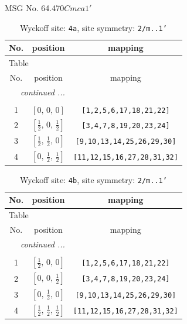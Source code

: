 \documentclass[fleqn,8pt]{jsarticle}
\begin{document}
\setcounter{MaxMatrixCols}{32}

\renewcommand{\tablename}{Table~}
\renewcommand{\figurename}{Figure~}
\begin{center}
\LARGE
MSG No. 64.470\quad$Cmca1'$
\end{center}
\renewcommand{\arraystretch}{1.2}
\begin{longtable}{ccc}
\caption{Wyckoff site: {\tt 4a}, site symmetry: {\tt 2/m..1'}}
 \\
 \hline \hline
No. & position & mapping \\ \hline \endfirsthead

\multicolumn{2}{l}{\tablename\ \thetable{}} \\
 \hline \hline
No. & position & mapping \\ \hline \endhead

 \hline \hline
\multicolumn{2}{r}{\footnotesize\it continued ...} \\ \endfoot

 \hline \hline
\multicolumn{2}{r}{} \\ \endlastfoot

1 & $\left[ 0,\, 0,\, 0 \right]$ & {\tt [1,2,5,6,17,18,21,22]} \\ \hline
2 & $\left[ \frac{1}{2},\, 0,\, \frac{1}{2} \right]$ & {\tt [3,4,7,8,19,20,23,24]} \\ \hline
3 & $\left[ \frac{1}{2},\, \frac{1}{2},\, 0 \right]$ & {\tt [9,10,13,14,25,26,29,30]} \\ \hline
4 & $\left[ 0,\, \frac{1}{2},\, \frac{1}{2} \right]$ & {\tt [11,12,15,16,27,28,31,32]} \\
\end{longtable}
\renewcommand{\arraystretch}{1.2}
\begin{longtable}{ccc}
\caption{Wyckoff site: {\tt 4b}, site symmetry: {\tt 2/m..1'}}
 \\
 \hline \hline
No. & position & mapping \\ \hline \endfirsthead

\multicolumn{2}{l}{\tablename\ \thetable{}} \\
 \hline \hline
No. & position & mapping \\ \hline \endhead

 \hline \hline
\multicolumn{2}{r}{\footnotesize\it continued ...} \\ \endfoot

 \hline \hline
\multicolumn{2}{r}{} \\ \endlastfoot

1 & $\left[ \frac{1}{2},\, 0,\, 0 \right]$ & {\tt [1,2,5,6,17,18,21,22]} \\ \hline
2 & $\left[ 0,\, 0,\, \frac{1}{2} \right]$ & {\tt [3,4,7,8,19,20,23,24]} \\ \hline
3 & $\left[ 0,\, \frac{1}{2},\, 0 \right]$ & {\tt [9,10,13,14,25,26,29,30]} \\ \hline
4 & $\left[ \frac{1}{2},\, \frac{1}{2},\, \frac{1}{2} \right]$ & {\tt [11,12,15,16,27,28,31,32]} \\
\end{longtable}
\end{document}
